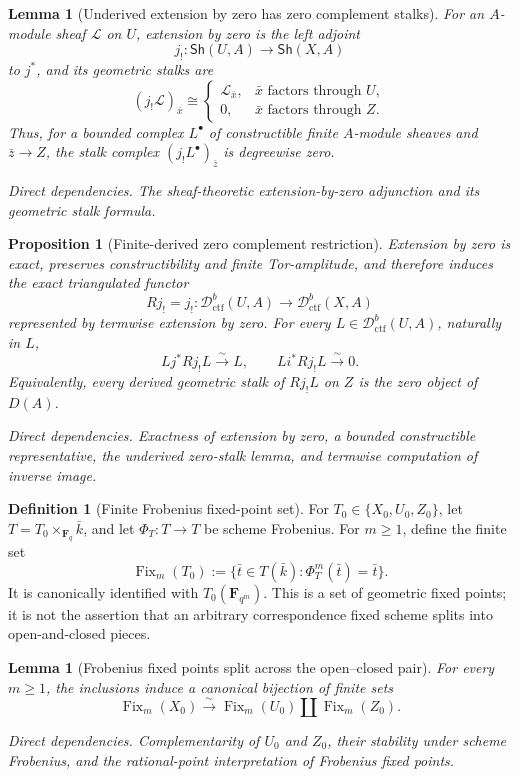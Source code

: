 \documentclass[10pt]{article}
\newtheorem{proposition}[theorem]{Proposition}
\newtheorem{lemma}[theorem]{Lemma}
\theoremstyle{definition}
\newtheorem{definition}[theorem]{Definition}
\newcommand{\Fq}{\mathbf F_q}
\newcommand{\Dctf}{\mathcal D^b_{\mathrm{ctf}}}
\newcommand{\Fix}{\operatorname{Fix}}
\newcommand{\depends}[1]{\par\smallskip\noindent\textit{Direct dependencies.} #1\par}
\begin{document}
\begin{lemma}[Underived extension by zero has zero complement stalks]
For an \(A\)-module sheaf \(\mathcal L\) on \(U\), extension by zero is the
left adjoint
\[
 j_!: \mathsf{Sh}(U,A)\longrightarrow\mathsf{Sh}(X,A)
\]
to \(j^*\), and its geometric stalks are
\[
 (j_!\mathcal L)_{\bar x}\cong
 \begin{cases}
  \mathcal L_{\bar x},&\bar x\text{ factors through }U,\\
  0,&\bar x\text{ factors through }Z.
 \end{cases}
\]
Thus, for a bounded complex \(L^\bullet\) of constructible finite
\(A\)-module sheaves and \(\bar z\to Z\), the stalk complex
\((j_!L^\bullet)_{\bar z}\) is degreewise zero.
\depends{The sheaf-theoretic extension-by-zero adjunction and its geometric
stalk formula.}
\end{lemma}

\begin{proposition}[Finite-derived zero complement restriction]
Extension by zero is exact, preserves constructibility and finite
Tor-amplitude, and therefore induces the exact triangulated functor
\[
 Rj_!=j_!:\Dctf(U,A)\longrightarrow\Dctf(X,A)
\]
represented by termwise extension by zero.  For every
\(L\in\Dctf(U,A)\), naturally in \(L\),
\[
 Lj^*Rj_!L\xrightarrow{\sim}L,
 \qquad
 Li^*Rj_!L\xrightarrow{\sim}0.
\]
Equivalently, every derived geometric stalk of \(Rj_!L\) on \(Z\) is the
zero object of \(D(A)\).
\depends{Exactness of extension by zero, a bounded constructible
representative, the underived zero-stalk lemma, and termwise computation of
inverse image.}
\end{proposition}

\begin{definition}[Finite Frobenius fixed-point set]
For \(T_0\in\{X_0,U_0,Z_0\}\), let \(T=T_0\times_{\Fq}\bar k\), and let
\(\Phi_T:T\to T\) be scheme Frobenius.  For \(m\geq1\), define the finite
set
\[
 \Fix_m(T_0):=
 \{\bar t\in T(\bar k):\Phi_T^m(\bar t)=\bar t\}.
\]
It is canonically identified with \(T_0(\mathbf F_{q^m})\).  This is a set
of geometric fixed points; it is not the assertion that an arbitrary
correspondence fixed scheme splits into open-and-closed pieces.
\end{definition}

\begin{lemma}[Frobenius fixed points split across the open--closed pair]
For every \(m\geq1\), the inclusions induce a canonical bijection of finite
sets
\[
 \Fix_m(X_0)\xrightarrow{\sim}
 \Fix_m(U_0)\amalg\Fix_m(Z_0).
\]
\depends{Complementarity of \(U_0\) and \(Z_0\), their stability under
scheme Frobenius, and the rational-point interpretation of Frobenius fixed
points.}
\end{lemma}
\end{document}
